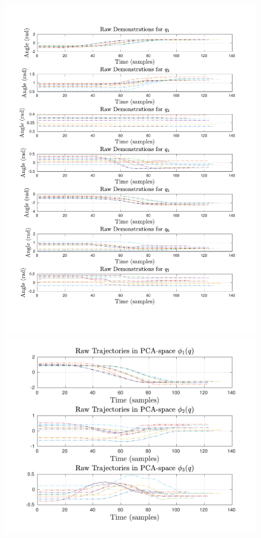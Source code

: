 \documentclass{article}
\begin{document}
\begin{enumerate}
\begin{figure}[!th] 
  \begin{minipage}{0.58\textwidth}
     	\centering 
     	\includegraphics[trim={1.2cm 2cm 1.7cm 2cm},clip,width=\linewidth]{../../src/JTDS_mat_lib/figures/raw_demos_pour.pdf}
  \end{minipage}
   \begin{minipage}{0.47\textwidth}
      	\centering
      	\includegraphics[trim={1.2cm 0.5cm 0.5cm 0.35cm},clip,width=\linewidth]{../../src/JTDS_mat_lib/figures/raw_demos_pca_pour.pdf}
      	\vspace{-5pt}
      	

\end{minipage}
\end{figure}
\end{enumerate}
\end{document}
